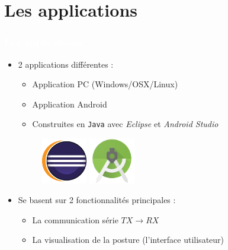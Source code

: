 \documentclass{beamer}
\begin{document}
\section{Les applications}
\begin{frame}
\frametitle{\textcolor{white}{Les applications}}
\begin{itemize}
\item 2 applications différentes :
\begin{itemize}
\item Application PC (Windows/OSX/Linux)
\item Application Android
\item Construites en \texttt{Java} avec \textit{Eclipse} et \textit{Android Studio}
\end{itemize}

\begin{figure}
\includegraphics[height=2cm]{images/eclipse.png}
\hspace{1cm}
\includegraphics[height=2cm]{images/android-studio.png}
\end{figure}

\item Se basent sur 2 fonctionnalités principales :
\begin{itemize}
\item La communication série $TX \rightarrow RX$
\item La visualisation de la posture (l'interface utilisateur)
\end{itemize}
\end{itemize}

\end{frame}
\end{document}
